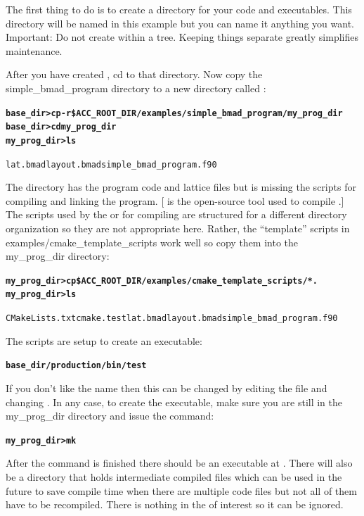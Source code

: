 \documentclass{hitec}
\newcommand{\BF}[1]{{\normalfont\textbf{#1}}}
\newenvironment{display}
  {\vspace*{-1.5ex} \begin{alltt}}
  {\end{alltt} \vspace*{-1.0ex}}
\begin{document}
The first thing to do is to create a  directory for your code and executables. This
directory will be named  in this example but you can name it anything you
want. Important: Do not create  within a  tree. Keeping things
separate greatly simplifies maintenance.

After you have created , cd to that directory. Now copy the
simple_bmad_program directory to a new directory called :
\begin{display}
  \BF{base_dir> cp -r \$ACC_ROOT_DIR/examples/simple_bmad_program/ my_prog_dir}
  \BF{base_dir> cd my_prog_dir}
  \BF{my_prog_dir> ls}

  lat.bmad   layout.bmad   simple_bmad_program.f90
\end{display}

The  directory has the program code and lattice files but is
missing the  scripts for compiling and linking the program.  [ is the
open-source tool used to compile \bmad.] The scripts used by the  or
 for compiling are structured for a different directory organization so they
are not appropriate here. Rather, the ``template'' scripts in
examples/cmake_template_scripts work well so copy them into the my_prog_dir
directory:
\begin{display}
  \BF{my_prog_dir> cp \$ACC_ROOT_DIR/examples/cmake_template_scripts/* .}
  \BF{my_prog_dir> ls}

  CMakeLists.txt  cmake.test  lat.bmad  layout.bmad simple_bmad_program.f90
\end{display}

The scripts are setup to create an executable:
\begin{display}
  \BF{base_dir/production/bin/test}
\end{display}
If you don't like the name  then this can be changed by editing the
 file and changing . In any case, to create the executable,
make sure you are still in the my_prog_dir directory and issue the  command:
\begin{display}
  \BF{my_prog_dir> mk}
\end{display}

After the  command is finished there should be an executable at
. There will also be a 
directory that holds intermediate compiled files which can be used in the future to save
compile time when there are multiple code files but not all of them have to be recompiled.
There is nothing in the  of interest so it can be ignored.
\end{document}
